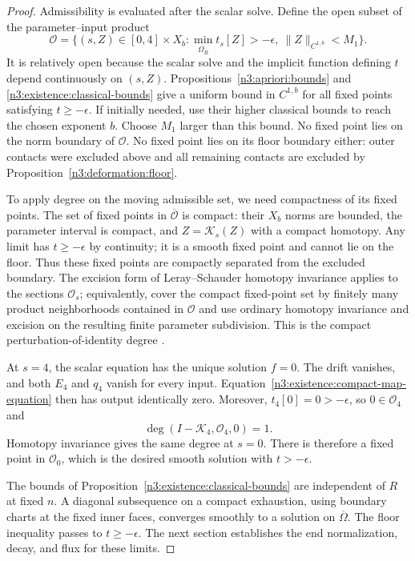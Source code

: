 \begin{proof}
Admissibility is evaluated after the scalar solve.  Define the open
subset of the parameter--input product
\begin{equation}\label{n3:existence:admissible-open-set}
 \mathcal O=\{(s,Z)\in[0,4]\times X_b:
       \min_{\overline{\Omega_R}}t_s[Z]>-\epsilon,
       \ \|Z\|_{C^{1,b}}<M_1\}.
\end{equation}
It is relatively open because the scalar solve and the implicit
function defining $t$ depend continuously on $(s,Z)$.
Propositions~\ref{n3:apriori:bounds} and
\ref{n3:existence:classical-bounds} give a uniform bound in $C^{1,b}$
for all fixed points satisfying $t\ge-\epsilon$.  If initially
needed, use their higher classical bounds to reach the chosen
exponent $b$.  Choose $M_1$ larger than this bound.  No fixed point
lies on the norm boundary of $\mathcal O$.  No fixed point lies on
its floor boundary either: outer contacts were excluded above and
all remaining contacts are excluded by
Proposition~\ref{n3:deformation:floor}.

To apply degree on the moving admissible set, we need compactness of
its fixed points.
The set of fixed points in $\overline{\mathcal O}$ is compact:
their $X_b$ norms are bounded, the parameter interval is compact,
and $Z=\mathcal K_s(Z)$ with a compact homotopy.  Any limit has
$t\ge-\epsilon$ by continuity; it is a smooth fixed point and
cannot lie on the floor.  Thus these fixed points are compactly
separated from the excluded boundary.  The excision form of
Leray--Schauder homotopy invariance applies to the sections
$\mathcal O_s$; equivalently, cover the compact fixed-point set
by finitely many product neighborhoods contained in
$\mathcal O$ and use ordinary homotopy invariance and excision on
the resulting finite parameter subdivision.  This is the compact
perturbation-of-identity degree \cite{LeraySchauder1934}.

At $s=4$, the scalar equation has the unique solution $f=0$.
The drift vanishes, and both $E_4$ and $q_4$ vanish for every input.
Equation~\eqref{n3:existence:compact-map-equation} then has output
identically zero.  Moreover, $t_4[0]=0>-\epsilon$, so
$0\in\mathcal O_4$ and
\begin{equation}\label{n3:existence:degree-one}
 \deg(I-\mathcal K_4,\mathcal O_4,0)=1.
\end{equation}
Homotopy invariance gives the same degree at $s=0$.  There is
therefore a fixed point in $\mathcal O_0$, which is the desired
smooth solution with $t>-\epsilon$.

The bounds of Proposition~\ref{n3:existence:classical-bounds} are
independent of $R$ at fixed $n$.  A diagonal subsequence on a
compact exhaustion, using boundary charts at the fixed inner
faces, converges smoothly to a solution on $\overline\Omega$.
The floor inequality passes to $t\ge-\epsilon$. The next section
establishes the end normalization, decay, and flux for these limits.
\end{proof}
